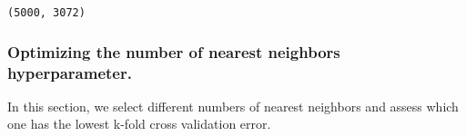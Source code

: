 \documentclass[11pt]{article}
\begin{document}
    \begin{Verbatim}[commandchars=\\\{\}]
(5000, 3072)

    \end{Verbatim}

    \hypertarget{optimizing-the-number-of-nearest-neighbors-hyperparameter.}{%
\subsubsection{Optimizing the number of nearest neighbors
hyperparameter.}\label{optimizing-the-number-of-nearest-neighbors-hyperparameter.}}

In this section, we select different numbers of nearest neighbors and
assess which one has the lowest k-fold cross validation error.
\end{document}
